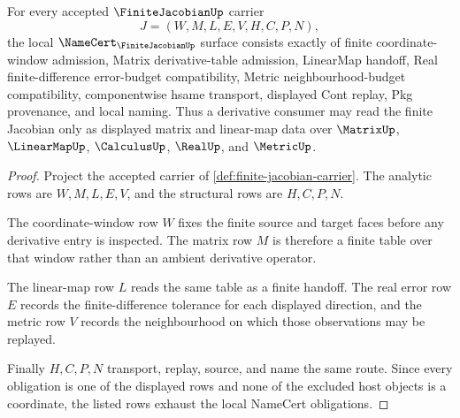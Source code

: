 \begin{theorem}
\label{thm:finite-jacobian-namecert-obligations}
For every accepted $\FiniteJacobianUp$ carrier
$$
J=(W,M,L,E,V,H,C,P,N),
$$
the local $\NameCert_{\FiniteJacobianUp}$ surface consists exactly of finite coordinate-window admission, Matrix derivative-table admission, LinearMap handoff, Real finite-difference error-budget compatibility, Metric neighbourhood-budget compatibility, componentwise hsame transport, displayed Cont replay, Pkg provenance, and local naming. Thus a derivative consumer may read the finite Jacobian only as displayed matrix and linear-map data over $\MatrixUp$, $\LinearMapUp$, $\CalculusUp$, $\RealUp$, and $\MetricUp$.
\end{theorem}
\begin{proof}
Project the accepted carrier of \autoref{def:finite-jacobian-carrier}. The analytic rows are $W,M,L,E,V$, and the structural rows are $H,C,P,N$.

The coordinate-window row $W$ fixes the finite source and target faces before any derivative entry is inspected. The matrix row $M$ is therefore a finite table over that window rather than an ambient derivative operator.

The linear-map row $L$ reads the same table as a finite handoff. The real error row $E$ records the finite-difference tolerance for each displayed direction, and the metric row $V$ records the neighbourhood on which those observations may be replayed.

Finally $H,C,P,N$ transport, replay, source, and name the same route. Since every obligation is one of the displayed rows and none of the excluded host objects is a coordinate, the listed rows exhaust the local NameCert obligations.
\end{proof}

